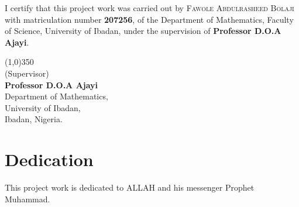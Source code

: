 \documentclass[
    a4paper,%
    12pt,%
    oneside, %
    openany, %
]{book}
\begin{document}
\renewcommand{\thepage}{\roman{page}}
I certify that this project work was carried out by \textsc{Fawole Abdulrasheed Bolaji} with matriculation number \textbf{207256}, of the Department of Mathematics, Faculty of Science, University of Ibadan, under the supervision of \textbf{Professor D.O.A Ajayi}.
\vspace*{3cm}
\begin{center}
    \line(1,0){350}\\
    (Supervisor)\\
    \vspace*{-0.25cm}
    \textbf{Professor D.O.A Ajayi}
    \\
    \vspace*{-0.25cm}
    Department of Mathematics,
    \\
    \vspace*{-0.25cm}
    University of Ibadan,
    \\
    \vspace*{-0.25cm}
    Ibadan, Nigeria.

\end{center}
\newpage

\chapter*{Dedication}
This project work is dedicated to ALLAH and his messenger Prophet Muhammad.

\newpage



{}
\tableofcontents
\listoffigures
\newpage
{}







\end{document}
